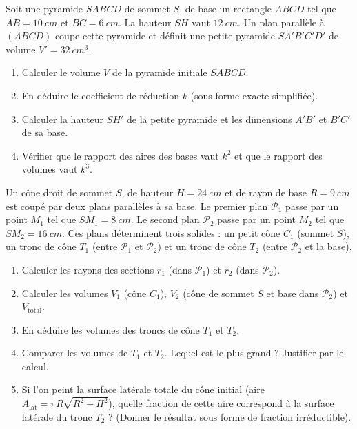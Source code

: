 \documentclass[11pt]{article}
\begin{document}
\begin{exercice}
Soit une pyramide $SABCD$ de sommet $S$, de base un rectangle $ABCD$ tel que $AB = \SI{10}{cm}$ et $BC = \SI{6}{cm}$. La hauteur $SH$ vaut $\SI{12}{cm}$. Un plan parallèle à $(ABCD)$ coupe cette pyramide et définit une petite pyramide $SA'B'C'D'$ de volume $V' = \SI{32}{cm^3}$.
\begin{enumerate}
    \item Calculer le volume $V$ de la pyramide initiale $SABCD$.
    \item En déduire le coefficient de réduction $k$ (sous forme exacte simplifiée).
    \item Calculer la hauteur $SH'$ de la petite pyramide et les dimensions $A'B'$ et $B'C'$ de sa base.
    \item Vérifier que le rapport des aires des bases vaut $k^2$ et que le rapport des volumes vaut $k^3$.
\end{enumerate}
\end{exercice}

\begin{exercice}
Un cône droit de sommet $S$, de hauteur $H = \SI{24}{cm}$ et de rayon de base $R = \SI{9}{cm}$ est coupé par deux plans parallèles à sa base.
Le premier plan $\mathcal{P}_1$ passe par un point $M_1$ tel que $SM_1 = \SI{8}{cm}$.
Le second plan $\mathcal{P}_2$ passe par un point $M_2$ tel que $SM_2 = \SI{16}{cm}$.
Ces plans déterminent trois solides : un petit cône $C_1$ (sommet $S$), un tronc de cône $T_1$ (entre $\mathcal{P}_1$ et $\mathcal{P}_2$) et un tronc de cône $T_2$ (entre $\mathcal{P}_2$ et la base).
\begin{enumerate}
    \item Calculer les rayons des sections $r_1$ (dans $\mathcal{P}_1$) et $r_2$ (dans $\mathcal{P}_2$).
    \item Calculer les volumes $V_1$ (cône $C_1$), $V_2$ (cône de sommet $S$ et base dans $\mathcal{P}_2$) et $V_{\text{total}}$.
    \item En déduire les volumes des troncs de cône $T_1$ et $T_2$.
    \item Comparer les volumes de $T_1$ et $T_2$. Lequel est le plus grand ? Justifier par le calcul.
    \item Si l'on peint la surface latérale totale du cône initial (aire $A_{\text{lat}} = \pi R \sqrt{R^2+H^2}$), quelle fraction de cette aire correspond à la surface latérale du tronc $T_2$ ? (Donner le résultat sous forme de fraction irréductible).
\end{enumerate}
\end{exercice}
\end{document}
